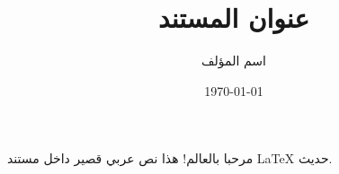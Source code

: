 \documentclass[12pt]{article}
\title{عنوان المستند}
\author{اسم المؤلف}
\date{\today}
\begin{document}
\maketitle

\begin{Arabic}
مرحبا بالعالم! هذا نص عربي قصير داخل مستند \textenglish{LaTeX} حديث.
\end{Arabic}
\end{document}
